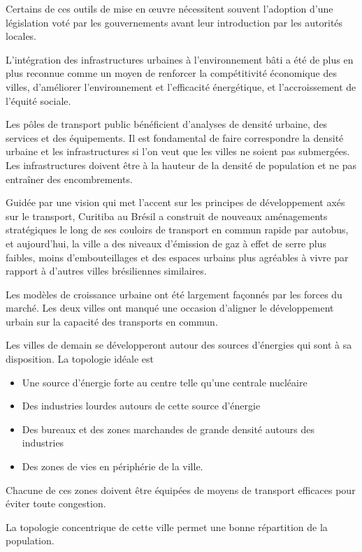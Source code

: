 Certains de ces outils de mise en œuvre nécessitent souvent l'adoption d'une législation voté
par les gouvernements avant leur introduction par les autorités locales.

L'intégration des infrastructures urbaines à l'environnement bâti a été de plus en plus
reconnue comme un moyen de renforcer la compétitivité économique des villes, d'améliorer
l'environnement et l'efficacité énergétique, et l'accroissement de l'équité sociale.

Les pôles de transport public bénéficient d'analyses de densité urbaine,
des services et des équipements. Il est fondamental de faire correspondre la densité urbaine et
les infrastructures si l'on veut que les villes ne soient pas submergées.
Les infrastructures doivent être à la hauteur de la densité de population et ne pas entraîner des encombrements.

Guidée par une vision qui met l'accent sur les principes de développement axés sur le transport,
Curitiba au Brésil a construit de nouveaux aménagements stratégiques le long de ses couloirs de transport
en commun rapide par autobus, et aujourd'hui, la ville a des niveaux d'émission de gaz à effet de serre plus
faibles, moins d'embouteillages et des espaces urbains plus agréables à vivre par rapport à d'autres
villes brésiliennes similaires.

Les modèles de croissance urbaine ont été largement façonnés par les forces du marché. Les deux villes
ont manqué une occasion d'aligner le développement urbain sur la capacité des transports en commun.

Les villes de demain se développeront autour des sources d'énergies qui sont à sa disposition.
La topologie idéale est

\begin{itemize}
    \item Une source d'énergie forte au centre telle qu'une centrale nucléaire
    \item Des industries lourdes autours de cette source d'énergie
    \item Des bureaux et des zones marchandes de grande densité autours des industries
    \item Des zones de vies en périphérie de la ville.
\end{itemize}

Chacune de ces zones doivent être équipées de moyens de transport efficaces pour
éviter toute congestion.

La topologie concentrique de cette ville permet une bonne répartition de la population.

